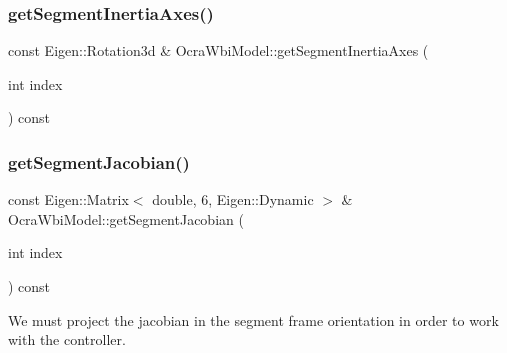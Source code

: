 \hypertarget{classocra__icub_1_1OcraWbiModel_aaba3e74c964c1b7b2645aeae5bb5ade9}{}\label{classocra__icub_1_1OcraWbiModel_aaba3e74c964c1b7b2645aeae5bb5ade9} 
\subsubsection{\texorpdfstring{get\+Segment\+Inertia\+Axes()}{getSegmentInertiaAxes()}}
{\footnotesize\ttfamily const Eigen\+::\+Rotation3d \& Ocra\+Wbi\+Model\+::get\+Segment\+Inertia\+Axes (\begin{DoxyParamCaption}\item[{int}]{index }\end{DoxyParamCaption}) const\hspace{0.3cm}{\ttfamily [virtual]}}

\hypertarget{classocra__icub_1_1OcraWbiModel_a46613002aff4de4170c671bb5a6eab5c}{}\label{classocra__icub_1_1OcraWbiModel_a46613002aff4de4170c671bb5a6eab5c} 
\subsubsection{\texorpdfstring{get\+Segment\+Jacobian()}{getSegmentJacobian()}\hspace{0.1cm}{\footnotesize\ttfamily [1/2]}}
{\footnotesize\ttfamily const Eigen\+::\+Matrix$<$ double, 6, Eigen\+::\+Dynamic $>$ \& Ocra\+Wbi\+Model\+::get\+Segment\+Jacobian (\begin{DoxyParamCaption}\item[{int}]{index }\end{DoxyParamCaption}) const\hspace{0.3cm}{\ttfamily [virtual]}}

We must project the jacobian in the segment frame orientation in order to work with the controller.\hypertarget{classocra__icub_1_1OcraWbiModel_ac1e91eca8bd09fee58de68e3a6c1b670}{}\label{classocra__icub_1_1OcraWbiModel_ac1e91eca8bd09fee58de68e3a6c1b670} 
